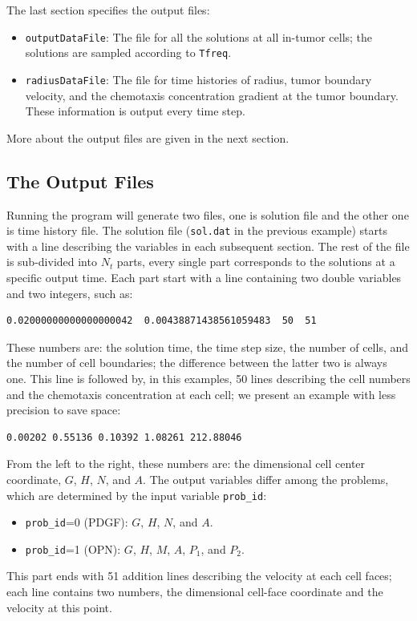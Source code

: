\documentclass{amsproc}
\theoremstyle{definition}
\theoremstyle{remark}
\numberwithin{equation}{section}
\numberwithin{figure}{section}
\begin{document}
The last section specifies the output files:
\begin{itemize}
\item \texttt{outputDataFile}: The file for all the solutions at all in-tumor cells; the solutions are sampled according to \texttt{Tfreq}.
\item \texttt{radiusDataFile}: The file for time histories of radius, tumor boundary velocity, and the chemotaxis concentration gradient at the tumor boundary.
These information is output every time step.
\end{itemize}
More about the output files are given in the next section.

\subsection{The Output Files}
Running the program will generate two files, one is solution file and the other one is time history file.
The solution file (\texttt{sol.dat} in the previous example) starts with a line describing the variables in each subsequent section. 
The rest of the file is sub-divided into $N_t$ parts, every single part corresponds to the solutions at a specific output time.
Each part start with a line containing two double variables and two integers, such as:
\begin{lstlisting}[backgroundcolor = \color{lightgray}, language = bash, xleftmargin = 0.1cm, framexleftmargin = 0.1cm]
0.02000000000000000042	0.00438871438561059483	50	51
\end{lstlisting}
These numbers are: the solution time, the time step size, the number of cells, and the number of cell boundaries; the difference between the latter two is always one.
This line is followed by, in this examples, 50 lines describing the cell numbers and the chemotaxis concentration at each cell; we present an example with less precision to save space:
\begin{lstlisting}[backgroundcolor = \color{lightgray}, language = bash, xleftmargin = 0.1cm, framexleftmargin = 0.1cm]
0.00202 0.55136 0.10392 1.08261 212.88046
\end{lstlisting}
From the left to the right, these numbers are: the dimensional cell center coordinate, $G$, $H$, $N$, and $A$.
The output variables differ among the problems, which are determined by the input variable \texttt{prob\_id}:
\begin{itemize}
\item \texttt{prob\_id}=0 (PDGF): $G$, $H$, $N$, and $A$.
\item \texttt{prob\_id}=1 (OPN): $G$, $H$, $M$, $A$, $P_1$, and $P_2$.
\end{itemize}
This part ends with 51 addition lines describing the velocity at each cell faces; each line contains two numbers, the dimensional cell-face coordinate and the velocity at this point.
\end{document}
